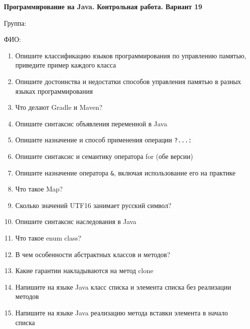 \documentclass[12pt]{article}
\begin{document}
\newpage\begin{minipage}{\textwidth}
\textbf{Программирование на Java. Контрольная работа. Вариант 19}

Группа: \underline{\hspace{3cm}}

ФИО: \underline{\hspace{10cm}}

\begin{enumerate}
\item Опишите классификацию языков программирования по управлению памятью, приведите пример каждого класса
\item Опишите достоинства и недостатки способов управления памятью в разных языках программирования
\item Что делают Gradle и Maven?
\item Опишите синтаксис объявления переменной в Java
\item Опишите назначение и способ применения операции \verb|?...:|
\item Опишите синтаксис и семантику оператора for (обе версии)
\item Опишите назначение оператора \verb|&|, включая использование его на практике
\item Что такое Map?
\item Сколько значений UTF16 занимает русский символ?
\item Опишите синтаксис наследования в Java
\item Что такое enum class?
\item В чем особенности абстрактных классов и методов?
\item Какие гарантии накладываются на метод clone
\item Напишите на языке Java класс списка и элемента списка без реализации методов
\item Напишите на языке Java реализацию метода вставки элемента в начало списка

\end{enumerate}
\end{minipage}
\end{document}
